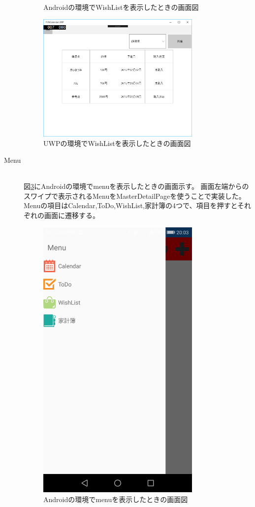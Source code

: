 \documentclass[a4j]{jarticle}
\begin{document}
\begin{description}
\begin{figure}[h]
 			\caption{Androidの環境でWishListを表示したときの画面図}
 			\label{WishListMainFig1} %
		\end{figure}
        \begin{figure}[h]
			\centering
 			\includegraphics[width=80mm]{figures/WishListMainUWP.png} %
 			\caption{UWPの環境でWishListを表示したときの画面図}
 			\label{WishListMainFig2} %
		\end{figure}
        \clearpage
	\item[Menu] \mbox{} \\
    	図\ref{MenuFig1}にAndroidの環境でmenuを表示したときの画面示す。
		画面左端からのスワイプで表示されるMenuをMasterDetailPageを使うことで実装した。
        Menuの項目はCalendar,ToDo,WishList,家計簿の4つで、項目を押すとそれぞれの画面に遷移する。
        
        \begin{figure}[h]
			\centering
 			\includegraphics[width=80mm]{figures/MenuPage.png} %
 			\caption{Androidの環境でmenuを表示したときの画面図}
 			\label{MenuFig1} %
		\end{figure}
\end{description}
\end{document}

